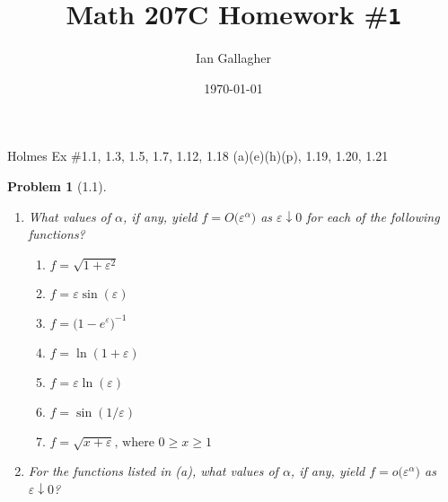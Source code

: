 \documentclass[11pt]{article}
\title{Math 207C Homework \#\texttt{1}}
\author{Ian Gallagher}
\date{\today}
\newcommand{\vep}{\varepsilon}
\theoremstyle{problemstyle}
\newtheorem{problem}{Problem}
\begin{document}
\maketitle

\noindent Holmes Ex \#1.1, 1.3, 1.5, 1.7, 1.12, 1.18 (a)(e)(h)(p), 1.19, 1.20, 1.21

\begin{problem}[1.1]
\mbox{} %
\begin{enumerate}
  \item What values of $\alpha$, if any, yield 
        \(
        f = O\bigl(\vep^\alpha\bigr)
        \)
        as $\vep \downarrow 0$ for each of the following functions?
  \begin{multicols}{2}
    \begin{enumerate}
      \item $f = \sqrt{1 + \vep^2}$ 
      \item $f = \vep \sin(\vep)$ 
      \item $f = \bigl(1 - e^\vep)^{-1}$
      \item $f = \ln(1 + \vep)$
      \item $f = \vep \ln(\vep)$
      \item $f = \sin(1 / \vep)$
      \item $f = \sqrt{x + \vep}\text{, where } 0 \geq x \geq 1$ \newline\mbox{}
    \end{enumerate}
  \end{multicols}
\item For the functions listed in (a), what values of $\alpha$, if any, yield
      \(
      f = o\bigl(\vep^\alpha\bigr)
      \)
      as $\vep \downarrow 0$?
\end{enumerate}
\end{problem}
\end{document}
